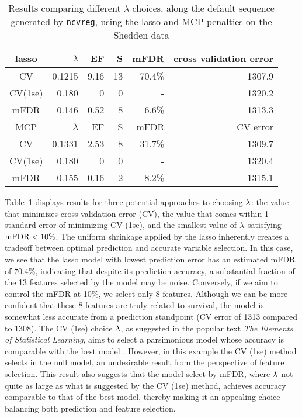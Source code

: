 \begin{table}[htb!]
\centering
\begin{tabular}{c | r r r r r }
  \hline
lasso & $\lambda$ & EF & S & mFDR & cross validation error \\ 
	\hline
	CV & 0.1215 & 9.16 & 13 & 70.4\% &  1307.9 \\
	CV(1se) & 0.180  &  0 &  0 &  -  & 1320.2 \\
	mFDR & 0.146 & 0.52 & 8 & 6.6\% & 1313.3 \\
\hline
MCP & $\lambda$ & EF & S & mFDR  & CV error \\
	\hline
	CV & 0.1331 & 2.53 & 8 & 31.7\% &  1309.7 \\
	CV(1se) & 0.180 & 0 & 0 & - &  1320.4 \\
	mFDR & 0.155 & 0.16 & 2 & 8.2\% &  1315.1 \\
		\hline
\end{tabular}
\caption{\label{Tab:shedden} Results comparing different $\lambda$ choices, along the default sequence generated by {\tt ncvreg}, using the lasso and MCP penalties on the Shedden data }
\end{table}

Table~\ref{Tab:shedden} displays results for three potential approaches to choosing $\lambda$: the value that minimizes cross-validation error (CV), the value that comes within 1 standard error of minimizing CV (1se), and the smallest value of $\lambda$ satisfying $\textrm{mFDR} < 10\%$.  The uniform shrinkage applied by the lasso inherently creates a tradeoff between optimal prediction and accurate variable selection. In this case, we see that the lasso model with lowest prediction error has an estimated mFDR of 70.4\%, indicating that despite its prediction accuracy, a substantial fraction of the 13 features selected by the model may be noise. Conversely, if we aim to control the mFDR at 10\%, we select only 8 features.  Although we can be more confident that these 8 features are truly related to survival, the model is somewhat less accurate from a prediction standpoint (CV error of 1313 compared to 1308).  The CV (1se) choice $\lambda$, as suggested in the popular text \textit{The Elements of Statistical Learning}, aims to select a parsimonious model whose accuracy is comparable with the best model \citep{Hastie2009}. However, in this example the CV (1se) method selects in the null model, an undesirable result from the perspective of feature selection. This result also suggests that the model select by mFDR, where $\lambda$ not quite as large as what is suggested by the CV (1se) method, achieves accuracy comparable to that of the best model, thereby making it an appealing choice balancing both prediction and feature selection.

